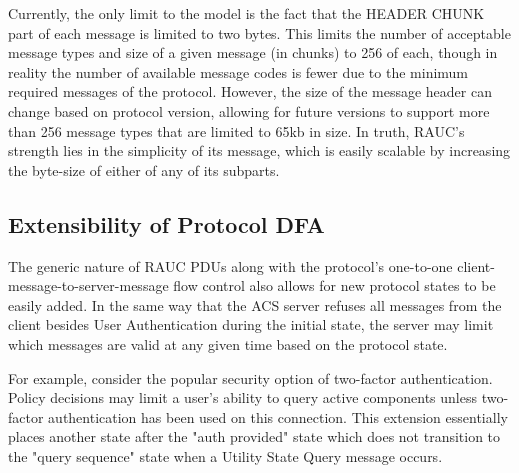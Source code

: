 Currently, the only limit to the model is the fact that the HEADER CHUNK part of each message is limited to two bytes. This limits the number of acceptable message types and size of a given message (in chunks) to 256 of each, though in reality the number of available message codes is fewer due to the minimum required messages of the protocol. However, the size of the message header can change based on protocol version, allowing for future versions to support more than 256 message types that are limited to 65kb in size. In truth,  RAUC's strength lies in the simplicity of its message, which is easily scalable by increasing the byte-size of either of any of its subparts. 

\subsection{Extensibility of Protocol DFA}
The generic nature of RAUC PDUs along with the protocol's one-to-one client-message-to-server-message flow control also allows for new protocol states to be easily added. In the same way that the ACS server refuses all messages from the client besides User Authentication during the initial state, the server may limit which messages are valid at any given time based on the protocol state. 

For example, consider the popular security option of two-factor authentication. Policy decisions may limit a user's ability to query active components unless two-factor authentication has been used on this connection. This extension essentially places another state after the "auth provided" state which does not transition to the "query sequence" state when a Utility State Query message occurs.
